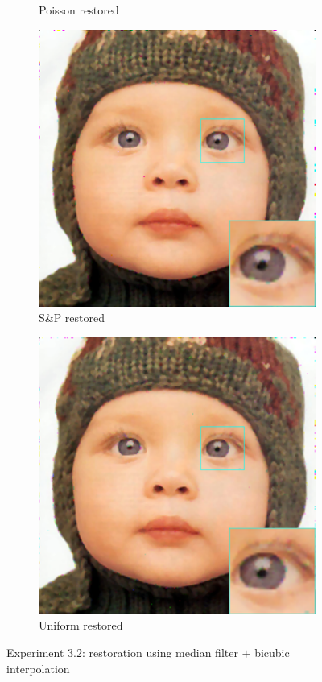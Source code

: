 \begin{figure}
\begin{subfigure}{0.24\textwidth}
		\caption{Poisson restored}
	\end{subfigure}
	\begin{subfigure}{0.24\textwidth}
		\includegraphics[width=\textwidth]{images/exp3.2/salt.png}
		\caption{S\&P restored}
	\end{subfigure}
	\begin{subfigure}{0.24\textwidth}
		\includegraphics[width=\textwidth]{images/exp3.2/uniform.png}
		\caption{Uniform restored}
	\end{subfigure}
	\caption{Experiment 3.2: restoration using median filter $+$ bicubic interpolation}
	\label{fig:exp3.2}
\end{figure}

